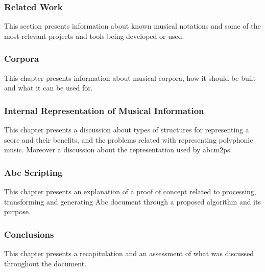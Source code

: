 \documentclass[main.tex]{subfiles}
\begin{document}
\subsubsection{Related Work}

This section presents information about known musical notations and some of the most relevant
projects and tools being developed or used.

\subsubsection{Corpora}

This chapter presents information about musical corpora, how it should be built and what it can be
used for.

\subsubsection{Internal Representation of Musical Information}

This chapter presents a discussion about types of structures for representing a score and
their benefits, and the problems related with representing polyphonic music. Moreover a
discussion about the representation used by abcm2ps.

\subsubsection{Abc Scripting}

This chapter presents an explanation of a proof of concept related to processing, transforming and
generating Abc document through a proposed algorithm and its purpose.


\subsubsection{Conclusions}

This chapter presents a recapitulation and an assessment of what was discussed throughout the
document.
\end{document}

